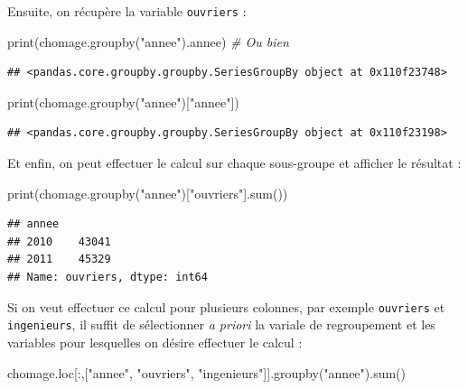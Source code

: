 \documentclass[12pt,]{book}
\newenvironment{Shaded}{\begin{snugshade}}{\end{snugshade}}
\newcommand{\StringTok}[1]{\textcolor[rgb]{0.31,0.60,0.02}{#1}}
\newcommand{\CommentTok}[1]{\textcolor[rgb]{0.56,0.35,0.01}{\textit{#1}}}
\newcommand{\BuiltInTok}[1]{#1}
\newcommand{\NormalTok}[1]{#1}
\numberwithin{equation}{section}
\numberwithin{countremarque}{section}
\begin{document}
Ensuite, on récupère la variable \texttt{ouvriers} :

\begin{Shaded}
\begin{Highlighting}[]
\BuiltInTok{print}\NormalTok{(chomage.groupby(}\StringTok{"annee"}\NormalTok{).annee)}
\CommentTok{# Ou bien}
\end{Highlighting}
\end{Shaded}

\begin{lstlisting}
## <pandas.core.groupby.groupby.SeriesGroupBy object at 0x110f23748>
\end{lstlisting}

\begin{Shaded}
\begin{Highlighting}[]
\BuiltInTok{print}\NormalTok{(chomage.groupby(}\StringTok{"annee"}\NormalTok{)[}\StringTok{"annee"}\NormalTok{])}
\end{Highlighting}
\end{Shaded}

\begin{lstlisting}
## <pandas.core.groupby.groupby.SeriesGroupBy object at 0x110f23198>
\end{lstlisting}

Et enfin, on peut effectuer le calcul sur chaque sous-groupe et afficher
le résultat :

\begin{Shaded}
\begin{Highlighting}[]
\BuiltInTok{print}\NormalTok{(chomage.groupby(}\StringTok{"annee"}\NormalTok{)[}\StringTok{"ouvriers"}\NormalTok{].}\BuiltInTok{sum}\NormalTok{())}
\end{Highlighting}
\end{Shaded}

\begin{lstlisting}
## annee
## 2010    43041
## 2011    45329
## Name: ouvriers, dtype: int64
\end{lstlisting}

Si on veut effectuer ce calcul pour plusieurs colonnes, par exemple
\texttt{ouvriers} et \texttt{ingenieurs}, il suffit de sélectionner
\emph{a priori} la variale de regroupement et les variables pour
lesquelles on désire effectuer le calcul :

\begin{Shaded}
\begin{Highlighting}[]
\NormalTok{chomage.loc[:,[}\StringTok{"annee"}\NormalTok{, }\StringTok{"ouvriers"}\NormalTok{, }\StringTok{"ingenieurs"}\NormalTok{]].groupby(}\StringTok{"annee"}\NormalTok{).}\BuiltInTok{sum}\NormalTok{()}
\end{Highlighting}
\end{Shaded}
\end{document}
